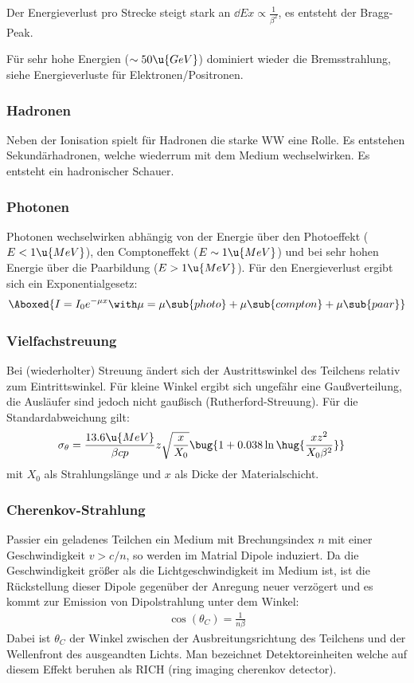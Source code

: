 \documentclass[final]{summery_5.0}
\begin{document}
Der Energieverlust pro Strecke steigt stark an $\dd Ex \propto \frac1{\beta^2}$, es entsteht der Bragg-Peak.

Für sehr hohe Energien ($\sim50\u {GeV}$) dominiert wieder die Bremsstrahlung, siehe Energieverluste für Elektronen/Positronen.

\subsubsection{Hadronen}
Neben der Ionisation spielt für Hadronen die starke WW eine Rolle. Es entstehen Sekundärhadronen, welche wiederrum mit dem Medium wechselwirken. Es entsteht ein hadronischer Schauer. 

\subsubsection{Photonen}
Photonen wechselwirken abhängig von der Energie über den Photoeffekt ($E<1\u{MeV}$), den Comptoneffekt ($E\sim 1\u{MeV}$) und bei sehr hohen Energie über die Paarbildung ($E>1\u{MeV}$).
Für den Energieverlust ergibt sich ein Exponentialgesetz:
\begin{align*}
    \Aboxed{I = I_0 e^{-\mu x}\with \mu = \mu\sub{photo}+\mu\sub{compton}+\mu\sub{paar}}
\end{align*}

\subsubsection{Vielfachstreuung} 
Bei (wiederholter) Streuung ändert sich der Austrittswinkel des Teilchens relativ zum Eintrittswinkel. Für kleine Winkel ergibt sich ungefähr eine Gaußverteilung, die Ausläufer sind jedoch nicht gaußisch (Rutherford-Streuung). Für die Standardabweichung gilt:
\begin{align}
    \sigma_\theta &= \frac{13.6\u{MeV}}{\beta c p} z \sqrt{\frac x{X_0}} \bug{1 + 0.038 \ln\hug{\frac{x z^2}{X_0\beta^2}}}
\end{align}
mit $X_0$ als Strahlungslänge und $x$ als Dicke der Materialschicht.

\subsubsection{Cherenkov-Strahlung}
Passier ein geladenes Teilchen ein Medium mit Brechungsindex $n$ mit einer Geschwindigkeit $v>c/n$, so werden im Matrial Dipole induziert. Da die Geschwindigkeit größer als die Lichtgeschwindigkeit im Medium ist, ist die Rückstellung dieser Dipole gegenüber der Anregung neuer verzögert und es kommt zur Emission von Dipolstrahlung unter dem Winkel:
\begin{align*}
    \boxed{\cos(\theta_C) = \frac1{n\beta}}
\end{align*}
Dabei ist $\theta_C$ der Winkel zwischen der Ausbreitungsrichtung des Teilchens und der Wellenfront des ausgeandten Lichts.
Man bezeichnet Detektoreinheiten welche auf diesem Effekt beruhen  als RICH (ring imaging cherenkov detector).
\end{document}
